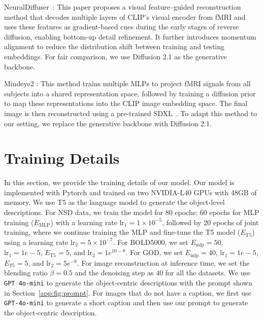 \begin{itemize}
{    \item NeuralDiffuser~\citep{li2025neuraldiffuser}: This paper proposes a visual feature–guided reconstruction method that decodes multiple layers of CLIP’s visual encoder from fMRI and uses these features as gradient-based cues during the early stages of reverse diffusion, enabling bottom-up detail refinement. It further introduces momentum alignment to reduce the distribution shift between training and testing embeddings. For fair comparison, we use Diffusion 2.1 as the generative backbone.
    }
    \item Mindeye2 \citep{scotti2024mindeye2}: This method trains multiple MLPs to project fMRI signals from all subjects into a shared representation space, followed by training a diffusion prior to map these representations into the CLIP image embedding space. The final image is then reconstructed using a pre-trained SDXL~\citep{podell2023sdxl}. To adapt this method to our setting, we replace the generative backbone with Diffusion 2.1.
\end{itemize}

\section{Training Details}
\label{app:training}
In this section, we provide the training details of our model. Our model is implemented with Pytorch and trained on two NVIDIA-L40 GPUs with 48GB of memory. We use T5 as the language model to generate the object-level descriptions.  For NSD data, we train the model for 80 epochs: 60 epochs for MLP training ($E_{\text{MLP}}$) with a learning rate $\text{lr}_1 = 1 \times 10^{-5}$, followed by 20 epochs of joint training, where we continue training the MLP and fine-tune the T5 model ($E_{\text{T5}}$) using a learning rate $\text{lr}_2 = 5 \times 10^{-7}$. For BOLD5000, we set $E_{\text{mlp}}=50$,  $\text{lr}_1=1e-5$, $E_{\text{T5}}=5$, and $\text{lr}_2=1e^{10-8}$. For GOD, we set $E_{\text{mlp}}=40$, $\text{lr}_1=1e-5$, $E_{T5}=5$, and $\text{lr}_2=5e^{-9}$. For image reconstruction at inference time, we set the blending ratio $\beta=0.5$ and the denoising step as $40$ for all the datasets. We use \texttt{GPT 4o-mini} to generate the object-centric descriptions with the prompt shown in Section~\ref{app:fig:prompt}. For images that do not have a caption, we first use \texttt{GPT-4o-mini} to generate a short caption and then use our prompt to generate the object-centric description.






